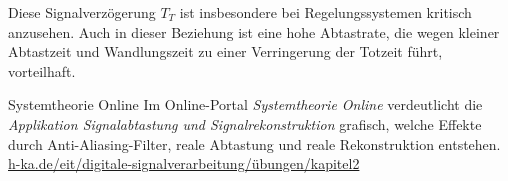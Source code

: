 Diese Signalverzögerung \(T_{T}\) ist insbesondere bei Regelungssystemen kritisch anzusehen. Auch in dieser Beziehung ist eine hohe Abtastrate, die wegen kleiner Abtastzeit und Wandlungszeit zu einer Verringerung der Totzeit führt, vorteilhaft.

\begin{application}{Systemtheorie Online}
  Im Online-Portal \emph{Systemtheorie Online} verdeutlicht die \emph{Applikation Signalabtastung und Signalrekonstruktion} grafisch, welche Effekte durch Anti-Aliasing-Filter, reale Abtastung und reale Rekonstruktion entstehen.
  \tcblower
  \url{h-ka.de/eit/digitale-signalverarbeitung/übungen/kapitel2}
\end{application}
